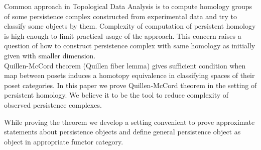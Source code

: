 Common approach in Topological Data Analysis is to compute homology groups of some persistence complex constructed from experimental data and try to classify some objects by them. Complexity of computation of persistent homology is high enough to limit practical usage of the approach. This concern raises a question of how to construct persistence complex with same homology as initially given with smaller dimension.\\

Quillen-McCord theorem (Quillen fiber lemma) gives sufficient condition when map between posets induces a homotopy equivalence in classifying spaces of their poset categories. In this paper we prove Quillen-McCord theorem in the setting of persistent homology. We believe it to be the tool to reduce complexity of observed persistence complexes.

While proving the theorem we develop a setting convenient to prove approximate statements about persistence objects and define general persistence object as object in appropriate functor category.
